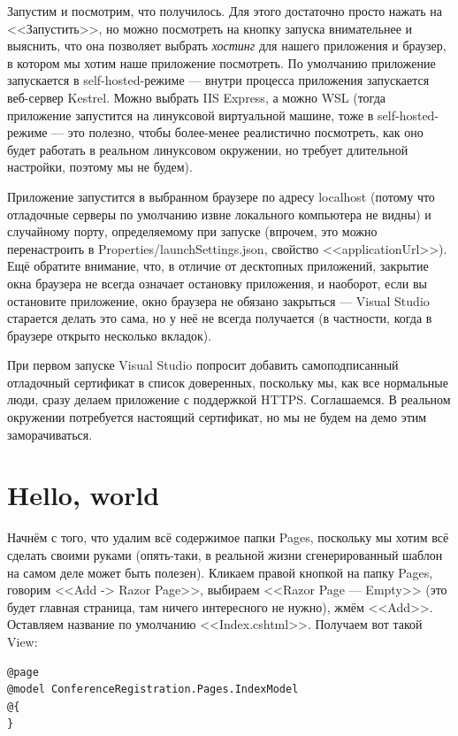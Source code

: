 \documentclass{../../text-style}
\begin{document}
Запустим и посмотрим, что получилось. Для этого достаточно просто нажать на <<Запустить>>, но можно посмотреть на кнопку запуска внимательнее и выяснить, что она позволяет выбрать \textit{хостинг} для нашего приложения и браузер, в котором мы хотим наше приложение посмотреть. По умолчанию приложение запускается в self-hosted-режиме --- внутри процесса приложения запускается веб-сервер Kestrel. Можно выбрать IIS Express, а можно WSL (тогда приложение запустится на линуксовой виртуальной машине, тоже в self-hosted-режиме --- это полезно, чтобы более-менее реалистично посмотреть, как оно будет работать в реальном линуксовом окружении, но требует длительной настройки, поэтому мы не будем). 

Приложение запустится в выбранном браузере по адресу localhost (потому что отладочные серверы по умолчанию извне локального компьютера не видны) и случайному порту, определяемому при запуске (впрочем, это можно перенастроить в Properties/launchSettings.json, свойство <<applicationUrl>>). Ещё обратите внимание, что, в отличие от десктопных приложений, закрытие окна браузера не всегда означает остановку приложения, и наоборот, если вы остановите приложение, окно браузера не обязано закрыться --- Visual Studio старается делать это сама, но у неё не всегда получается (в частности, когда в браузере открыто несколько вкладок).

При первом запуске Visual Studio попросит добавить самоподписанный отладочный сертификат в список доверенных, поскольку мы, как все нормальные люди, сразу делаем приложение с поддержкой HTTPS. Соглашаемся. В реальном окружении потребуется настоящий сертификат, но мы не будем на демо этим заморачиваться.

\section{Hello, world}

Начнём с того, что удалим всё содержимое папки Pages, поскольку мы хотим всё сделать своими руками (опять-таки, в реальной жизни сгенерированный шаблон на самом деле может быть полезен). Кликаем правой кнопкой на папку Pages, говорим <<Add -> Razor Page>>, выбираем <<Razor Page --- Empty>> (это будет главная страница, там ничего интересного не нужно), жмём <<Add>>. Оставляем название по умолчанию <<Index.cshtml>>. Получаем вот такой View:

\begin{verbatim}
@page
@model ConferenceRegistration.Pages.IndexModel
@{
}
\end{verbatim}
\end{document}
